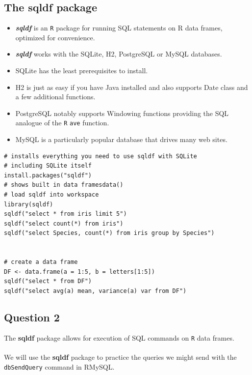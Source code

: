 \subsection*{The sqldf package}
\begin{itemize}
\item \textbf{\textit{ sqldf}} is an \texttt{R} package for running SQL statements on R data frames, optimized for convenience. 

\item \textbf{\textit{sqldf}} works with the SQLite, H2, PostgreSQL or MySQL databases. 

\item SQLite has the least prerequisites to install. 
\item H2 is just as easy if you have Java installed and also supports Date class and a few additional functions. 

\item PostgreSQL notably supports Windowing functions providing the SQL analogue of the \texttt{R} \texttt{ave} function. 

\item MySQL is a particularly popular database that drives many web sites. 

\end{itemize}
\begin{framed}
\begin{verbatim}
# installs everything you need to use sqldf with SQLite
# including SQLite itself
install.packages("sqldf")
# shows built in data framesdata() 
# load sqldf into workspace
library(sqldf)
sqldf("select * from iris limit 5")
sqldf("select count(*) from iris")
sqldf("select Species, count(*) from iris group by Species")


# create a data frame
DF <- data.frame(a = 1:5, b = letters[1:5])
sqldf("select * from DF")
sqldf("select avg(a) mean, variance(a) var from DF")
\end{verbatim}
\end{framed}
\newpage
\subsection*{Question 2}
The \textbf{sqldf} package allows for execution of SQL commands on \texttt{R} data frames. \\\\ \noindent We will use the \textbf{sqldf} package to practice the queries we might send with the \texttt{dbSendQuery} command in RMySQL. 

